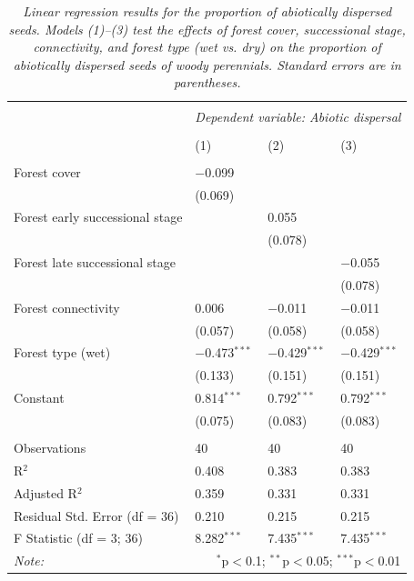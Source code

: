\newpage
\begin{table}[H]
\centering
\scriptsize %
\caption{\textit{Linear regression results for the proportion of abiotically dispersed seeds. Models (1)–(3) test the effects of forest cover, successional stage, connectivity, and forest type (wet vs. dry) on the proportion of abiotically dispersed seeds of woody perennials. Standard errors are in parentheses.}}
\begin{tabularx}{\textwidth}{@{\extracolsep{3pt}}lXXX} 
\\[-1ex]\hline 
\hline \\[-1ex] 
 & \multicolumn{3}{c}{\textit{Dependent variable: Abiotic dispersal}} \\ 
\\[-1ex] & (1) & (2) & (3)\\ 
\hline \\[-0.8ex] 
Forest cover & $-$0.099 &  &  \\ 
 & (0.069) &  &  \\ 
Forest early successional stage &  & 0.055 &  \\ 
 &  & (0.078) &  \\ 
Forest late successional stage &  &  & $-$0.055 \\ 
 &  &  & (0.078) \\ 
Forest connectivity & 0.006 & $-$0.011 & $-$0.011 \\ 
 & (0.057) & (0.058) & (0.058) \\ 
Forest type (wet) & $-$0.473$^{***}$ & $-$0.429$^{***}$ & $-$0.429$^{***}$ \\ 
 & (0.133) & (0.151) & (0.151) \\ 
Constant & 0.814$^{***}$ & 0.792$^{***}$ & 0.792$^{***}$ \\ 
 & (0.075) & (0.083) & (0.083) \\ 
\hline \\[-0.8ex] 
Observations & 40 & 40 & 40 \\ 
R$^{2}$ & 0.408 & 0.383 & 0.383 \\ 
Adjusted R$^{2}$ & 0.359 & 0.331 & 0.331 \\ 
Residual Std. Error (df = 36) & 0.210 & 0.215 & 0.215 \\ 
F Statistic (df = 3; 36) & 8.282$^{***}$ & 7.435$^{***}$ & 7.435$^{***}$ \\ 
\hline 
\textit{Note:} & \multicolumn{3}{r}{$^{*}$p$<$0.1; $^{**}$p$<$0.05; $^{***}$p$<$0.01} \\ 
\end{tabularx} 
\label{tab:abiotic}
\end{table} 

